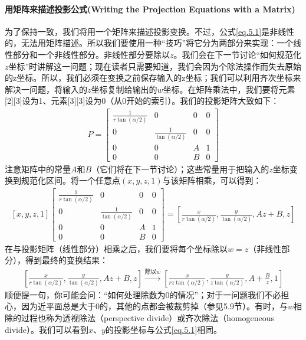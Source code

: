 \paragraph{用矩阵来描述投影公式(Writing the Projection Equations with a Matrix)}
\begin{flushleft}
为了保持一致，我们将用一个矩阵来描述投影变换。不过，公式\ref{eq.5.1}是非线性的，无法用矩阵描述。所以我们要使用一种“技巧”将它分为两部分来实现：一个线性部分和一个非线性部分。非线性部分要除以$z$。我们会在下一节讨论“如何规范化$z$坐标”时讲解这一问题；现在读者只需要知道，我们会因为个除法操作而失去原始的z坐标。所以，我们必须在变换之前保存输入的z坐标；我们可以利用齐次坐标来解决一问题，将输入的$z$坐标复制给输出的$w$坐标。在矩阵乘法中，我们要将元素[2][3]设为1、元素[3][3]设为0（从0开始的索引）。我们的投影矩阵大致如下：
\begin{align*}
P=\begin{bmatrix}
\frac{1}{r\tan(\alpha/2)} & 0 & 0 & 0\\
0 & \frac{1}{\tan(\alpha/2)} & 0 & 0\\
0 & 0 & A & 1\\
0 & 0 & B & 0
\end{bmatrix}
\end{align*}
注意矩阵中的常量$A$和$B$（它们将在下一节讨论）；这些常量用于把输入的$z$坐标变换到规范化区间。将一个任意点$(x,y,z,1)$与该矩阵相乘，可以得到：
\begin{align*}\tag{eq.5.2}\label{eq.5.2}
[x,y,z,1]\begin{bmatrix}
\frac{1}{r\tan(\alpha/2)} & 0 & 0 & 0\\
0 & \frac{1}{\tan(\alpha/2)} & 0 & 0\\
0 & 0 & A & 1\\
0 & 0 & B & 0
\end{bmatrix}=\left[ \frac{x}{r\tan(\alpha/2)},\frac{y}{\tan(\alpha/2)},Az+B,z\right]
\end{align*}
在与投影矩阵（线性部分）相乘之后，我们要将每个坐标除以$w = z$（非线性部分），得到最终的变换结果：
\begin{align*}\tag{eq.5.3}\label{eq.5.3}
\left[ \frac{x}{r\tan(\alpha/2)},\frac{y}{\tan(\alpha/2)},Az+B,z\right]
\xrightarrow[]{\text{除以$w$}}
\left[ \frac{x}{rz\tan(\alpha/2)},\frac{y}{z\tan(\alpha/2)},A+\frac{B}{z},1\right]
\end{align*}
顺便提一句，你可能会问：“如何处理除数为0的情况”；对于一问题我们不必担心，因为近平面总是大于0的，其他的点都会被裁剪掉（参见5.9节）。有时，与$w$相除的过程也称为透视除法（perspective divide）或齐次除法（homogeneous divide）。我们可以看到$x$、$y$的投影坐标与公式\ref{eq.5.1}相同。
\end{flushleft}

